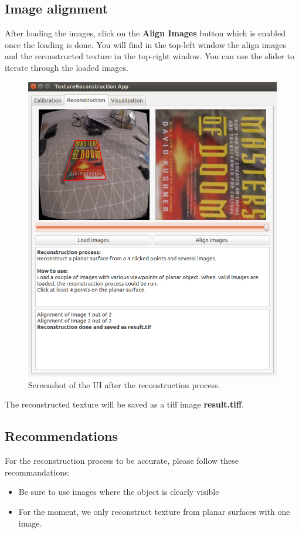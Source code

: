 \documentclass[12pt]{article}
\begin{document}
\subsection{Image alignment}
After loading the images, click on the \textbf{Align Images} button which is enabled once the loading is done. You will find in the top-left window the align images and the reconstructed texture in the top-right window. You can use the slider to iterate through the loaded images.
\begin{figure}[!ht]
    \centering
	\includegraphics[width=0.8\linewidth]{img/reconstructed.PNG}
\caption{Screenshot of the UI after the reconstruction process.}
\label{fig:ui_init}
\end{figure}
The reconstructed texture will be saved as a tiff image \textbf{result.tiff}.

\subsection{Recommendations}
For the reconstruction process to be accurate, please follow these recommandations:
\begin{itemize}
    \item Be sure to use images where the object is clearly visible
    \item For the moment, we only reconstruct texture from planar surfaces with one image.
\end{itemize}
\end{document}
